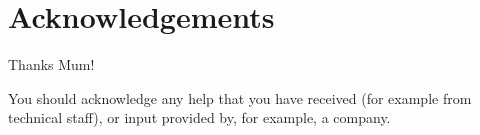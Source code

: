 \chapter*{\Huge{Acknowledgements}}
Thanks Mum!

You should acknowledge any help that you have received (for example from technical staff), or input provided by, for example, a company.